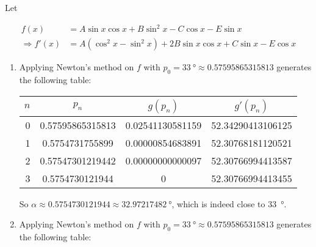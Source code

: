 \documentclass[../../../../Assignments]{subfiles}
\begin{document}
\begin{solution}
    Let

    \begin{align*}
                     f(x) &= A \sin{x} \cos{x} + B \sin^{2}{x} - C \cos{x} - E \sin{x} \\
        \Rightarrow f'(x) &= A (\cos^{2}{x} - \sin^{2}{x}) + 2 B \sin{x} \cos{x} + C \sin{x} - E \cos{x}
    \end{align*}

    \begin{enumerate}[label = \alph*)]
        \item Applying Newton's method on \(f\) with \(p_0 = \SI{33}{\degree}
            \approx \num{0.57595865315813}\) generates the following table:

            \begin{table}[H]
                \centering
                \begin{tabular}{r S[table-format=1.14] S[table-format=1.14] S[table-format=2.14]}
                    \toprule
                    \(n\)  &      {\(p_n\)}     &    {\(g(p_n)\)}    &    {\(g'(p_n)\)}    \\
                      &  0.57595865315813  &  0.02541130581159  &  52.34290413106125  \\
                        1  &  0.5754731755899   &  0.00000854683891  &  52.30768181120521  \\
                        2  &  0.57547301219442  &  0.00000000000097  &  52.30766994413587  \\
                        3  &  0.5754730121944   &  0                 &  52.30766994413455  \\
                    \bottomrule
                \end{tabular}
            \end{table}

            So \(\alpha \approx \num{0.5754730121944} \approx
            \SI{32.97217482}{\degree}\), which is indeed close to
            \SI{33}{\degree}.

        \item Applying Newton's method on \(f\) with \(p_0 = \SI{33}{\degree}
            \approx \num{0.57595865315813}\) generates the following table:


\end{enumerate}
\end{solution}
\end{document}

